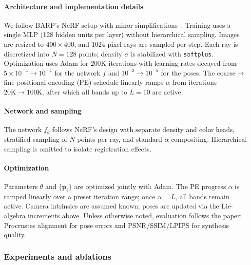 \begin{enrichment}
\begin{enrichment}
        \paragraph{Architecture and implementation details}
        \label{subsubsec:chapter23_barf_impl}
        We follow BARF’s NeRF setup with minor simplifications~\cite{lin2021_barf}.
        Training uses a single MLP (128 hidden units per layer) without hierarchical sampling. Images are resized to $400{\times}400$, and $1024$ pixel rays are sampled per step. Each ray is discretized into $N{=}128$ points; density $\sigma$ is stabilized with \texttt{softplus}. Optimization uses Adam for $200\textrm{K}$ iterations with learning rates decayed from $5{\times}10^{-4}\!\to\!10^{-4}$ for the network $f$ and $10^{-3}\!\to\!10^{-5}$ for the poses. The coarse$\to$fine positional encoding (PE) schedule linearly ramps $\alpha$ from iterations $20\textrm{K}\!\to\!100\textrm{K}$, after which all bands up to $L{=}10$ are active.
        
        \paragraph{Network and sampling}
        The network $f_\theta$ follows NeRF’s design with separate density and color heads, stratified sampling of $N$ points per ray, and standard $\alpha$-compositing. Hierarchical sampling is omitted to isolate registration effects.
        
        \paragraph{Optimization}
        Parameters \(\theta\) and \(\{\mathbf{p}_i\}\) are optimized jointly with Adam. The PE progress \(\alpha\) is ramped linearly over a preset iteration range; once \(\alpha=L\), all bands remain active. Camera intrinsics are assumed known; poses are updated via the Lie-algebra increments above. Unless otherwise noted, evaluation follows the paper: Procrustes alignment for pose errors and PSNR/SSIM/LPIPS for synthesis quality.        
        
        \subsubsection{Experiments and ablations}
        \label{enr:subsubsec_chapter23_barf_experiments}
        

\end{enrichment}
\end{enrichment}
